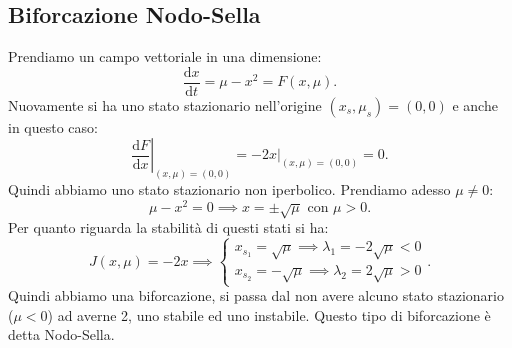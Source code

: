 \subsection{Biforcazione Nodo-Sella}%
Prendiamo un campo vettoriale in una dimensione:
\[
    \frac{\text{d} x}{\text{d} t} = \mu-x^2 = F(x, \mu) 
.\] 
Nuovamente si ha uno stato stazionario nell'origine $(x_s, \mu_s) = (0, 0)$  e anche in questo caso:
\[
    \left. \frac{\text{d} F}{\text{d} x} \right|_{(x, \mu) = (0, 0)}=\left.-2x\right|_{(x, \mu) = (0, 0) } = 0
.\] 
Quindi abbiamo uno stato stazionario non iperbolico. Prendiamo adesso $\mu\neq 0$: 
\[
    \mu-x^2 = 0 \implies  x = \pm\sqrt{\mu} \text{ con }\mu>0
.\] 
Per quanto riguarda la stabilità di questi stati si ha:
\[
    J(x, \mu) = -2x \implies  
    \begin{cases}
        x_{s_1}= \sqrt{\mu} \implies\lambda_1 = -2\sqrt{\mu} < 0 \\
        x_{s_2}= -\sqrt{\mu} \implies\lambda_2 = 2\sqrt{\mu} >0
    \end{cases}
.\] 
Quindi abbiamo una biforcazione, si passa dal non avere alcuno stato stazionario ($\mu<0$) ad averne 2, uno stabile ed uno instabile. Questo tipo di biforcazione è detta Nodo-Sella.

